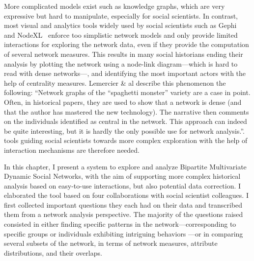 More complicated models exist such as knowledge graphs\cite{opitzInductionLargeScaleKnowledge2018}, which are very expressive but hard to manipulate, especially for social scientists.
In contrast, most visual and analytics tools widely used by social scientists such as Gephi~\cite{Gephi} and NodeXL~\cite{NodeXL} enforce too simplistic network models and only provide limited interactions for exploring the network data, even if they provide the computation of several network measures.
This results in many social historians ending their analysis by plotting the network using a node-link diagram---which is hard to read with dense networks---, and identifying the most important actors with the help of centrality measures\cite{lemercierQuantitativeMethodsHumanities2019}.
Lemercier \& al describe this phenomenon the following: ``Network graphs of the “spaghetti monster” variety are a case in point. Often, in historical papers, they are used to show that a network is dense (and that the author has mastered the new technology). The narrative then comments on the individuals identified as central in the network. This approach can indeed be quite interesting, but it is hardly the only possible use for network analysis.\cite{lemercierQuantitativeMethodsHumanities2019}''.
\va tools guiding social scientists towards more complex exploration with the help of interaction mechanisms are therefore needed.

In this chapter, I present a \va system to explore and analyze Bipartite Multivariate Dynamic Social Networks, with the aim of supporting more complex historical analysis based on easy-to-use interactions, but also potential data correction.
I elaborated the tool based on four collaborations with social scientist colleagues.
I first collected important questions they each had on their data and transcribed them from a network analysis perspective.
The majority of the questions raised consisted in either finding specific patterns in the network---corresponding to specific groups or individuals exhibiting intriguing behaviors ---or in comparing several subsets of the network, in terms of network measures, attribute distributions, and their overlaps.

